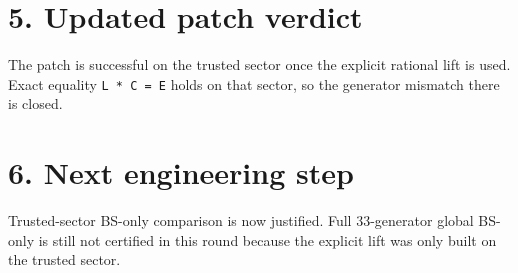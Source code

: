 \documentclass[11pt]{article}
\begin{document}
\section*{5. Updated patch verdict}
The patch is successful on the trusted sector once the explicit rational lift is used. Exact equality \texttt{L * C = E} holds on that sector, so the generator mismatch there is closed.

\section*{6. Next engineering step}
Trusted-sector BS-only comparison is now justified. Full 33-generator global BS-only is still not certified in this round because the explicit lift was only built on the trusted sector.
\end{document}
